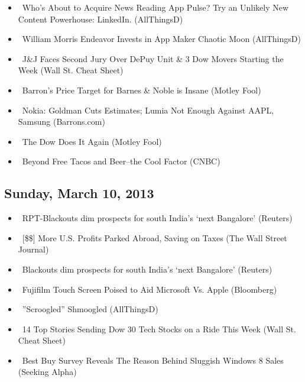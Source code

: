 \documentclass[11pt,asymmetric]{article}
\begin{document}
\begin{itemize}
\item\ Who's About to Acquire News Reading App Pulse? Try an Unlikely New Content Powerhouse: LinkedIn. (AllThingsD)
\item\ William Morris Endeavor Invests in App Maker Chaotic Moon (AllThingsD)
\item\ J\&J Faces Second Jury Over DePuy Unit \& 3 Dow Movers Starting the Week (Wall St. Cheat Sheet)
\item\ Barron’s Price Target for Barnes \& Noble is Insane (Motley Fool)
\item\ Nokia: Goldman Cuts Estimates; Lumia Not Enough Against AAPL, Samsung (Barrons.com)
\item\ The Dow Does It Again (Motley Fool)
\item\ Beyond Free Tacos and Beer--the Cool Factor (CNBC)
\end{itemize}
\subsection*{Sunday, March 10, 2013}
\begin{itemize}
\item\ RPT-Blackouts dim prospects for south India's `next Bangalore' (Reuters)
\item\ [\$\$] More U.S. Profits Parked Abroad, Saving on Taxes (The Wall Street Journal)
\item\ Blackouts dim prospects for south India's `next Bangalore' (Reuters)
\item\ Fujifilm Touch Screen Poised to Aid Microsoft Vs. Apple (Bloomberg)
\item\ ''Scroogled'' Shmoogled (AllThingsD)
\item\ 14 Top Stories Sending Dow 30 Tech Stocks on a Ride This Week (Wall St. Cheat Sheet)
\item\ Best Buy Survey Reveals The Reason Behind Sluggish Windows 8 Sales (Seeking Alpha)
\end{itemize}
\end{document}
